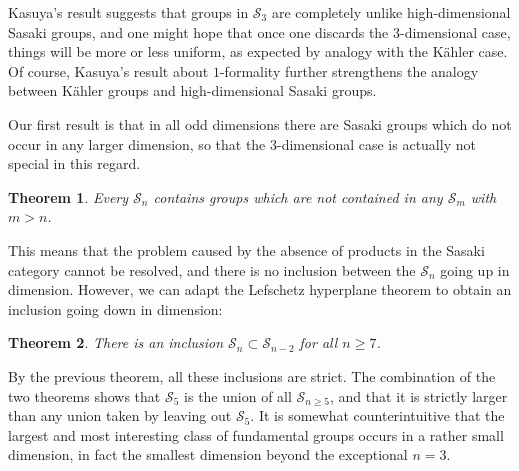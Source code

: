 \documentclass[12pt,leqno]{amsart}
\newcommand{\Sg}{\mathcal{S}}
\newtheorem{theor}{Theorem}
\begin{document}
Kasuya's result suggests that groups in $\Sg_3$ are completely unlike high-dimensional Sasaki groups,
and one might hope that once one discards the $3$-dimensional case, things will be more or 
less uniform, as expected by analogy with the K\"ahler case. Of course, Kasuya's result 
about $1$-formality further strengthens the analogy between K\"ahler groups and high-dimensional 
Sasaki groups. 

Our first result is that in all odd dimensions there are Sasaki groups which do not occur in any 
larger dimension, so that the $3$-dimensional case is actually not special in this regard.
\begin{theor}\label{t1}
Every $\Sg_{n}$ contains groups which are not contained in any $\Sg_{m}$ with $m>n$.
\end{theor}
This means that the problem caused by the absence of products in the Sasaki category
cannot be resolved, and there is no inclusion between the $\Sg_n$ going up in dimension. However,
we can adapt the Lefschetz hyperplane theorem to obtain an inclusion going down in dimension:
\begin{theor}\label{t2}
There is an inclusion $\Sg_{n}\subset\Sg_{n-2}$ for all $n\geq 7$. 
\end{theor}
By the previous theorem, all these inclusions are strict. The combination of the two theorems shows 
that $\Sg_5$ is the union of all $\Sg_{n\geq 5}$, and that it is strictly larger than any union taken by leaving 
out $\Sg_5$. It is somewhat counterintuitive that the largest and most interesting class of fundamental
groups occurs in a rather small dimension, in fact the smallest dimension beyond the exceptional $n=3$.
\end{document}

